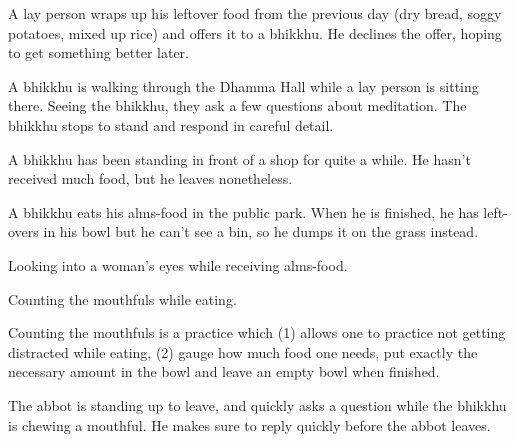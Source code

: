 \begin{exam}{\autoExamName}
\begin{problem*}
\begin{parts}
    \item {} A lay person wraps up his leftover food from the previous day
      (dry bread, soggy potatoes, mixed up rice) and offers it to a bhikkhu. He
      declines the offer, hoping to get something better later.

    \bigskip

    \item {} A bhikkhu is walking through the Dhamma Hall while a lay person
    is sitting there. Seeing the bhikkhu, they ask a few questions about
    meditation. The bhikkhu stops to stand and respond in careful detail.

    \bigskip

    \item {} A bhikkhu has been standing in front of a shop for quite a while.
    He hasn't received much food, but he leaves nonetheless.

    \bigskip

    \item {} A bhikkhu eats his alms-food in the public park. When he is
      finished, he has left-overs in his bowl but he can't see a bin, so he
      dumps it on the grass instead.

    \bigskip

    \item {} Looking into a woman's eyes while receiving alms-food.

    \bigskip

    \item {} Counting the mouthfuls while eating.

    \begin{solution}
      Counting the mouthfuls is a practice which
      (1) allows one to practice not getting distracted while eating,
      (2) gauge how much food one needs, put exactly the necessary amount in the bowl
      and leave an empty bowl when finished.
    \end{solution}

    \bigskip

    \item {} The abbot is standing up to leave, and quickly asks a question
      while the bhikkhu is chewing a mouthful. He makes sure to reply quickly
      before the abbot leaves.

    \end{parts}

  \end{problem*}

\end{exam}
